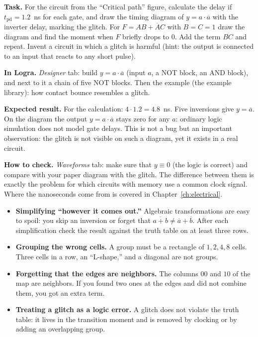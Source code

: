 \begin{diybox}
\textbf{Task.}  For the circuit from the ``Critical path'' figure,
calculate the delay if $t_\text{pd}=1.2$~ns for each gate, and draw the
timing diagram of $y=a\cdot\overline a$ with the inverter delay, marking the
glitch.  For $F=AB+\overline{A}C$ with $B=C=1$ draw the diagram and
find the moment when $F$ briefly drops to 0. Add the term $BC$ and repeat.
 Invent a circuit in which a glitch is harmful (hint: the output is
connected to an input that reacts to any short pulse).

\textbf{In Logra.} \emph{Designer} tab: build $y=a\cdot\overline a$ (input
$a$, a NOT block, an AND block), and next to it a chain of five NOT blocks.
Then the example  (the example library): how contact
bounce resembles a glitch.

\textbf{Expected result.} For the calculation: $4\cdot 1.2 = 4.8$~ns. Five
inversions give $y=\overline a$. On the diagram the output $y=a\cdot\overline
a$ stays zero for any $a$: ordinary logic simulation does not model gate
delays. This is not a bug but an important observation: the glitch is not
visible on such a diagram, yet it exists in a real circuit.

\textbf{How to check.} \emph{Waveforms} tab: make sure that $y\equiv0$ (the
logic is correct) and compare with your paper diagram with the glitch. The
difference between them is exactly the problem for which circuits with memory
use a common clock signal. Where the nanoseconds come from is covered in
Chapter~\ref{ch:electrical}.
\end{diybox}

\begin{warnbox}
\begin{itemize}
  \item \textbf{Simplifying ``however it comes out.''} Algebraic
        transformations are easy to spoil: you skip an inversion or forget
        that $\overline{a+b}\neq\overline a+\overline b$. After each
        simplification check the result against the truth table on at least
        three rows.
  \item \textbf{Grouping the wrong cells.} A group must be a rectangle of
        $1,2,4,8$ cells. Three cells in a row, an ``L-shape,'' and a diagonal
        are not groups.
  \item \textbf{Forgetting that the edges are neighbors.} The columns $00$ and
        $10$ of the map are neighbors. If you found two ones at the edges and
        did not combine them, you got an extra term.
  \item \textbf{Treating a glitch as a logic error.} A glitch does not
        violate the truth table: it lives in the transition moment and is
        removed by clocking or by adding an overlapping group.
\end{itemize}
\end{warnbox}


